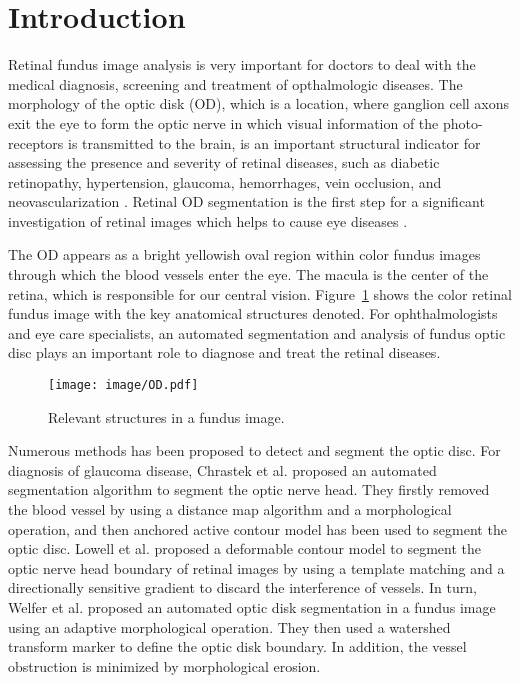 \documentclass{IOS-Book-Article}
\begin{document}
\section{Introduction}

Retinal fundus image analysis is very important for doctors to deal with the medical diagnosis, screening and treatment of opthalmologic diseases. The morphology of the optic  disk (OD), which is a location, where ganglion cell axons exit the eye to form the optic nerve in which visual information of the photo-receptors is transmitted to the brain, is an important structural indicator for assessing the presence and severity of retinal diseases, such as diabetic retinopathy, hypertension, glaucoma, hemorrhages, vein occlusion, and neovascularization \cite{macgillivray2014retinal}. Retinal OD segmentation is the first step for a significant investigation of retinal images which helps to cause eye diseases \cite{almazroa2015optic}. 

The OD appears as a bright yellowish oval region within color fundus images through which the blood vessels enter the eye. The macula is the center of the retina, which is responsible for our central vision. Figure~\ref{fig:figD} shows the color retinal fundus image with the key anatomical structures denoted. For ophthalmologists and eye care specialists, an automated segmentation and analysis of fundus optic disc plays an important role to diagnose and treat the retinal diseases. 

\begin{figure}[htp]
\centering
\texttt{[image: image/OD.pdf]}
\caption{Relevant structures in a fundus image.}
\label{fig:figD}
\end{figure}

Numerous methods has been proposed to detect and segment the optic disc. For diagnosis of glaucoma disease, Chrastek et al.\cite{chrastek2005automated} proposed an automated segmentation algorithm to segment the optic nerve head. They firstly removed the blood vessel by using a distance map algorithm and a morphological operation, and then anchored active contour model has been used to segment the optic disc. Lowell et al. \cite{lowell2004optic} proposed a deformable contour model to segment the optic nerve head boundary of retinal images by using a template matching and a directionally sensitive gradient to discard the interference of vessels. In turn, Welfer et al.\cite{welfer2010segmentation} proposed an automated optic disk segmentation in a fundus image using an adaptive morphological operation. They then used a watershed transform marker to define the optic disk boundary. In addition, the vessel obstruction is minimized by morphological erosion. 
\end{document}
